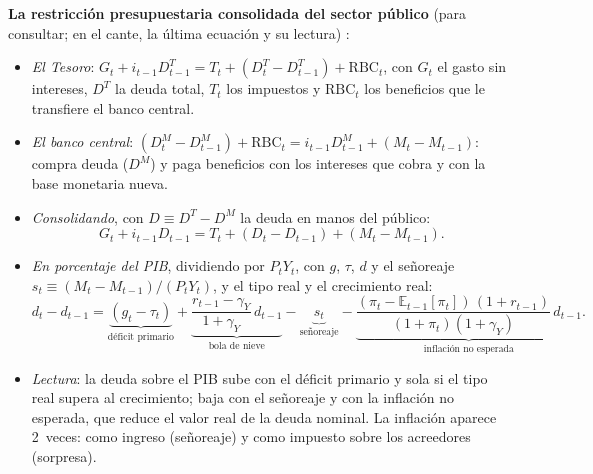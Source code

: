 \documentclass[11pt]{article}
\begin{document}
\begin{anotaciones}
\textbf{La restricción presupuestaria consolidada del sector público} (para consultar; en el cante, la última ecuación y su lectura)\nocite{Walsh2017Monetary} :
\begin{itemize}
\item \emph{El Tesoro}: $G_t+i_{t-1}D^T_{t-1}=T_t+(D^T_t-D^T_{t-1})+\mathrm{RBC}_t$, con $G_t$ el gasto sin intereses, $D^T$ la deuda total, $T_t$ los impuestos y $\mathrm{RBC}_t$ los beneficios que le transfiere el banco central.
\item \emph{El banco central}: $(D^M_t-D^M_{t-1})+\mathrm{RBC}_t=i_{t-1}D^M_{t-1}+(M_t-M_{t-1})$: compra deuda ($D^M$) y paga beneficios con los intereses que cobra y con la base monetaria nueva.
\item \emph{Consolidando}, con $D\equiv D^T-D^M$ la deuda en manos del público:
  \begin{equation*}
  G_t+i_{t-1}D_{t-1}=T_t+(D_t-D_{t-1})+(M_t-M_{t-1}).
  \end{equation*}
\item \emph{En porcentaje del PIB}, dividiendo por $P_tY_t$, con $g$, $\tau$, $d$ y el señoreaje $s_t\equiv(M_t-M_{t-1})/(P_tY_t)$, y el tipo real y el crecimiento real:
  \begin{equation*}
  d_t-d_{t-1}=\underbrace{(g_t-\tau_t)}_{\text{déficit primario}}+\underbrace{\frac{r_{t-1}-\gamma_Y}{1+\gamma_Y}\,d_{t-1}}_{\text{bola de nieve}}-\underbrace{s_t}_{\text{señoreaje}}-\underbrace{\frac{(\pi_t-\mathbb{E}_{t-1}[\pi_t])\,(1+r_{t-1})}{(1+\pi_t)(1+\gamma_Y)}\,d_{t-1}}_{\text{inflación no esperada}}.
  \end{equation*}
\item \emph{Lectura}: la deuda sobre el PIB sube con el déficit primario y sola si el tipo real supera al crecimiento; baja con el señoreaje y con la inflación no esperada, que reduce el valor real de la deuda nominal. La inflación aparece 2~veces: como ingreso (señoreaje) y como impuesto sobre los acreedores (sorpresa).
\end{itemize}
\end{anotaciones}
\end{document}
